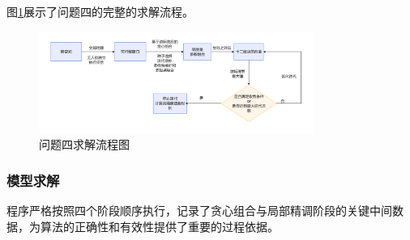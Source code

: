 \documentclass[12pt]{article}
\begin{document}
\begin{CJK}{UTF8}{gbsn}
		图\ref{fig:flowchart_q4}展示了问题四的完整的求解流程。
		
		\begin{figure}[H]
			\centering
			\includegraphics[width=0.8\textwidth]{pic/Fg8-Pb4.jpg}
			\caption{问题四求解流程图}
			\label{fig:flowchart_q4}
		\end{figure}
		
		
		\subsubsection{模型求解}
		程序严格按照四个阶段顺序执行，记录了贪心组合与局部精调阶段的关键中间数据，为算法的正确性和有效性提供了重要的过程依据。
		

\end{CJK}
\end{document}
